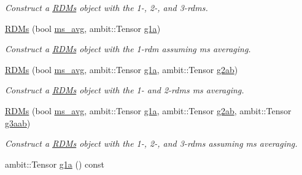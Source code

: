 \begin{DoxyCompactItemize}
\begin{DoxyCompactList}\small\item\em Construct a \mbox{\hyperlink{classforte_1_1_r_d_ms}{R\+D\+Ms}} object with the 1-\/, 2-\/, and 3-\/rdms. \end{DoxyCompactList}\item 
\mbox{\hyperlink{classforte_1_1_r_d_ms_a5d0e8a491644764b0453f6e5dd5af1e3}{R\+D\+Ms}} (bool \mbox{\hyperlink{classforte_1_1_r_d_ms_a9f729f9c1e45de736cf8095bdd5cf013}{ms\+\_\+avg}}, ambit\+::\+Tensor \mbox{\hyperlink{classforte_1_1_r_d_ms_ace67ab047686bffaf52839a191068d07}{g1a}})
\begin{DoxyCompactList}\small\item\em Construct a \mbox{\hyperlink{classforte_1_1_r_d_ms}{R\+D\+Ms}} object with the 1-\/rdm assuming ms averaging. \end{DoxyCompactList}\item 
\mbox{\hyperlink{classforte_1_1_r_d_ms_a6ea929edddecf163d671c277f74511a3}{R\+D\+Ms}} (bool \mbox{\hyperlink{classforte_1_1_r_d_ms_a9f729f9c1e45de736cf8095bdd5cf013}{ms\+\_\+avg}}, ambit\+::\+Tensor \mbox{\hyperlink{classforte_1_1_r_d_ms_ace67ab047686bffaf52839a191068d07}{g1a}}, ambit\+::\+Tensor \mbox{\hyperlink{classforte_1_1_r_d_ms_a5c2574da5bf2aba775481f0c46fb4202}{g2ab}})
\begin{DoxyCompactList}\small\item\em Construct a \mbox{\hyperlink{classforte_1_1_r_d_ms}{R\+D\+Ms}} object with the 1-\/ and 2-\/rdms ms averaging. \end{DoxyCompactList}\item 
\mbox{\hyperlink{classforte_1_1_r_d_ms_a1b3619a5c52e318e87036348d2f409da}{R\+D\+Ms}} (bool \mbox{\hyperlink{classforte_1_1_r_d_ms_a9f729f9c1e45de736cf8095bdd5cf013}{ms\+\_\+avg}}, ambit\+::\+Tensor \mbox{\hyperlink{classforte_1_1_r_d_ms_ace67ab047686bffaf52839a191068d07}{g1a}}, ambit\+::\+Tensor \mbox{\hyperlink{classforte_1_1_r_d_ms_a5c2574da5bf2aba775481f0c46fb4202}{g2ab}}, ambit\+::\+Tensor \mbox{\hyperlink{classforte_1_1_r_d_ms_a968c6ae793d2cb19a69d5f6412032557}{g3aab}})
\begin{DoxyCompactList}\small\item\em Construct a \mbox{\hyperlink{classforte_1_1_r_d_ms}{R\+D\+Ms}} object with the 1-\/, 2-\/, and 3-\/rdms assuming ms averaging. \end{DoxyCompactList}\item 
ambit\+::\+Tensor \mbox{\hyperlink{classforte_1_1_r_d_ms_ace67ab047686bffaf52839a191068d07}{g1a}} () const

\end{DoxyCompactItemize}
